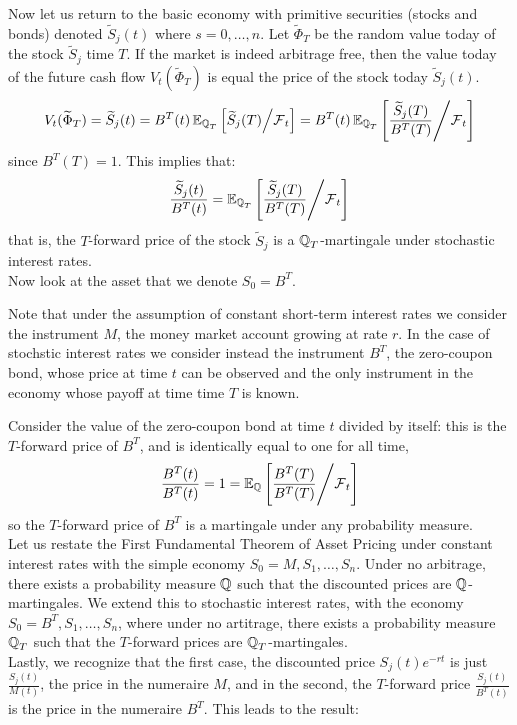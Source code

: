 \documentclass[11pt]{article}
\begin{document}
Now let us return to the basic economy with primitive securities (stocks and bonds) denoted $\widetilde{S}_j(t)$ where $s=0,\dots,n$. Let $\widetilde{\Phi}_T$ be the random value today of the stock $\widetilde{S}_j$ time $T$. If the market is indeed arbitrage free, then the value today of the future cash flow $V_t(\widetilde{\Phi}_T)$ is equal the price of the stock today $\widetilde{S}_j(t)$.
$$V_t(\widetilde{\Phi}_T) = \widetilde{S}_j(t) = B^T(t) \operatorname{\mathbb E}_{\operatorname{\mathbb Q}_T} \left[ \widetilde{S}_j(T) \middle/ \operatorname{\mathcal F}_t \right] = B^T(t) \operatorname{\mathbb E}_{\operatorname{\mathbb Q}_T} \left[ \frac{\widetilde{S}_j(T)}{B^T(T)} \middle/ \operatorname{\mathcal F}_t \right]$$
since $B^T(T) = 1$. This implies that:
$$\frac {\widetilde{S}_j(t)}{B^T(t)} = \operatorname{\mathbb E}_{\operatorname{\mathbb Q}_T} \left[ \frac{\widetilde{S}_j(T)}{B^T(T)} \middle/ \operatorname{\mathcal F}_t \right]$$
that is, the $T$-forward price of the stock $\widetilde{S}_j$ is a $\operatorname{\mathbb Q}_T$-martingale under stochastic interest rates.\\

Now look at the asset that we denote $S_0 = B^T$.
\begin{remark}
Note that under the assumption of constant short-term interest rates we consider the instrument $M$, the money market account growing at rate $r$. In the case of stochstic interest rates we consider instead the instrument $B^T$, the zero-coupon bond, whose price at time $t$ can be observed and the only instrument in the economy whose payoff at time time $T$ is known.
\end{remark}
Consider the value of the zero-coupon bond at time $t$ divided by itself: this is the $T$-forward price of $B^T$, and is identically equal to one for all time,
$$\frac {B^T(t)}{B^T(t)} = 1 = \operatorname{\mathbb E}_{\operatorname{\mathbb Q}} \left[ \frac{B^T(T)}{B^T(T)} \middle/ \operatorname{\mathcal F}_t \right]$$
so the $T$-forward price of $B^T$ is a martingale under any probability measure. \\

Let us restate the First Fundamental Theorem of Asset Pricing under constant interest rates with the simple economy $S_0=M, S_1, \dots, S_n$. Under no arbitrage, there exists a probability measure $\operatorname{\mathbb Q}$ such that the discounted prices are $\operatorname{\mathbb Q}$-martingales. We extend this to stochastic interest rates, with the economy $S_0=B^T, S_1, \dots, S_n$, where under no artitrage, there exists a probability measure $\operatorname{\mathbb Q}_T$ such that the $T$-forward prices are $\operatorname{\mathbb Q}_T$-martingales. \\

Lastly, we recognize that the first case, the discounted price $S_j(t)e^{-rt}$ is just $\frac{S_j(t)}{M(t)}$, the price in the numeraire $M$, and in the second, the $T$-forward price $\frac{S_j(t)}{B^T(t)}$ is the price in the numeraire $B^T$. This leads to the result:
\end{document}
